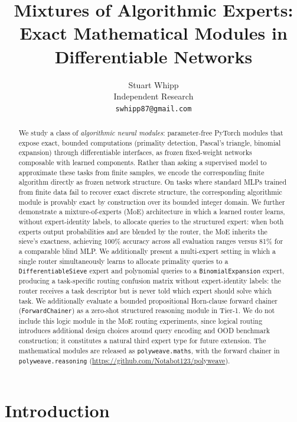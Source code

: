 \documentclass{article}
\title{Mixtures of Algorithmic Experts:\\
  Exact Mathematical Modules in Differentiable Networks}
\author{%
  Stuart Whipp\\
  Independent Research\\
  \texttt{swhipp87@gmail.com}
}
\begin{document}
\maketitle

\begin{abstract}
We study a class of \emph{algorithmic neural modules}: parameter-free PyTorch modules
that expose exact, bounded computations (primality detection, Pascal's triangle,
binomial expansion) through differentiable interfaces, as frozen fixed-weight networks
composable with learned components.
Rather than asking a supervised model to approximate these tasks from finite samples,
we encode the corresponding finite algorithm directly as frozen network structure.
On tasks where standard MLPs trained from finite data fail to recover exact discrete
structure, the corresponding algorithmic module is provably exact by construction over
its bounded integer domain.
We further demonstrate a mixture-of-experts (MoE) architecture in which a learned
router learns, without expert-identity labels, to allocate queries to the structured
expert: when both experts output probabilities and are blended by the router,
the MoE inherits the sieve's exactness, achieving 100\% accuracy across all evaluation
ranges versus 81\% for a comparable blind MLP.
We additionally present a multi-expert setting in which a single router simultaneously
learns to allocate primality queries to a \texttt{DifferentiableSieve} expert and
polynomial queries to a \texttt{BinomialExpansion} expert, producing a task-specific
routing confusion matrix without expert-identity labels: the router receives a task
descriptor but is never told which expert should solve which task.
We additionally evaluate a bounded propositional Horn-clause forward chainer
(\texttt{ForwardChainer}) as a zero-shot structured reasoning module in Tier-1.
We do not include this logic module in the MoE routing experiments, since logical
routing introduces additional design choices around query encoding and OOD benchmark
construction; it constitutes a natural third expert type for future extension.
The mathematical modules are released as \texttt{polyweave.maths},
with the forward chainer in \texttt{polyweave.reasoning}
(\url{https://github.com/Notabot123/polyweave}).
\end{abstract}

\section{Introduction}
\label{sec:intro}
\end{document}
